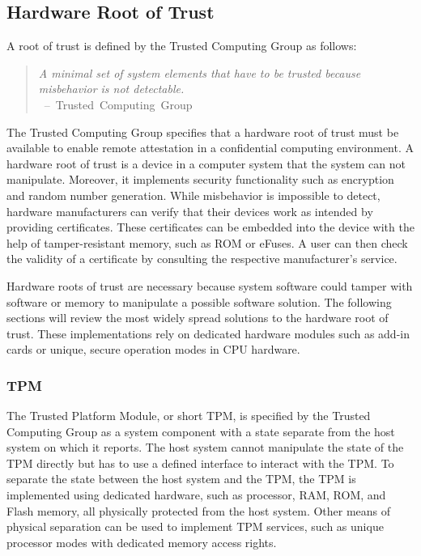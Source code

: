 
\subsection{Hardware Root of Trust}
A root of trust is defined by the Trusted Computing Group as follows:
\begin{quote}
    \textit{
        A minimal set of system elements that have to be trusted because misbehavior is not detectable. \\
    }
    \mbox{ -- Trusted Computing Group\cite{tpm_architecture}}
\end{quote}

The Trusted Computing Group specifies that a
hardware root of trust must be available to enable remote attestation in a confidential computing environment.\cite{tpm_architecture}
A hardware root of trust is a device in a computer system that the system can not manipulate. Moreover, it
implements security functionality such as encryption and random number generation. While misbehavior is impossible
to detect, hardware manufacturers can verify that their devices work as intended by providing certificates. These
certificates can be embedded into the device with the help of tamper-resistant memory, such as ROM or eFuses. A user can
then check the validity of a certificate by consulting the respective manufacturer's service.

Hardware roots of trust are necessary because system software could tamper with software or memory to manipulate a
possible software solution. The following sections will review the most widely spread solutions to the hardware root
of trust. These implementations rely on dedicated hardware modules such as add-in cards or unique, secure operation
modes in CPU hardware.

\subsubsection{TPM}
The Trusted Platform Module, or short TPM, is specified by the Trusted Computing Group as a system component with
a state separate from the host system on which it reports.\cite{tpm_architecture} The host system cannot
manipulate the state of the TPM directly but has to use a defined interface to interact with the TPM. To separate
the state between the host system and the TPM, the TPM is implemented using dedicated hardware, such as processor, RAM,
ROM, and Flash memory, all physically protected from the host system. Other means of physical separation can be used to
implement TPM services, such as unique processor modes with dedicated memory access rights.

